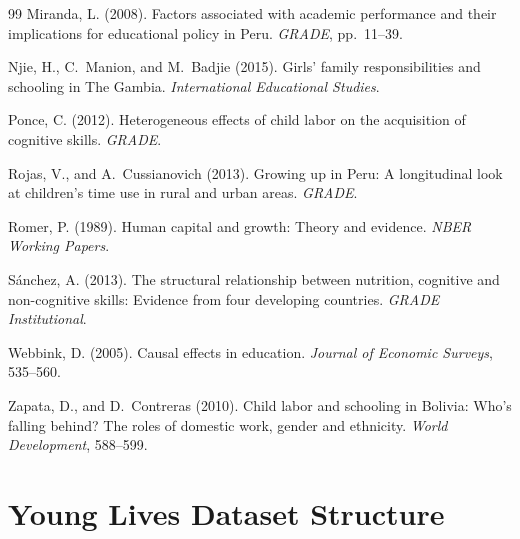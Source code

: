 \documentclass[12pt]{article}
\begin{document}
\begin{thebibliography}{99}
Miranda, L. (2008).
\newblock Factors associated with academic performance and their implications
  for educational policy in Peru.
\newblock \textit{GRADE}, pp.~11--39.

Njie, H., C.~Manion, and M.~Badjie (2015).
\newblock Girls' family responsibilities and schooling in The Gambia.
\newblock \textit{International Educational Studies}.

Ponce, C. (2012).
\newblock Heterogeneous effects of child labor on the acquisition of cognitive
  skills.
\newblock \textit{GRADE}.

Rojas, V., and A.~Cussianovich (2013).
\newblock Growing up in Peru: A longitudinal look at children's time use in
  rural and urban areas.
\newblock \textit{GRADE}.

Romer, P. (1989).
\newblock Human capital and growth: Theory and evidence.
\newblock \textit{NBER Working Papers}.

S\'{a}nchez, A. (2013).
\newblock The structural relationship between nutrition, cognitive and
  non-cognitive skills: Evidence from four developing countries.
\newblock \textit{GRADE Institutional}.

Webbink, D. (2005).
\newblock Causal effects in education.
\newblock \textit{Journal of Economic Surveys}, 535--560.

Zapata, D., and D.~Contreras (2010).
\newblock Child labor and schooling in Bolivia: Who's falling behind? The roles
  of domestic work, gender and ethnicity.
\newblock \textit{World Development}, 588--599.

\end{thebibliography}

\newpage
\appendix

\section{Young Lives Dataset Structure}
\label{app:data}
\end{document}
